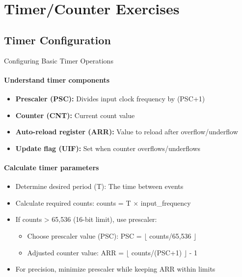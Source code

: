 \section{Timer/Counter Exercises}

\subsection{Timer Configuration}

\begin{KR}{Configuring Basic Timer Operations}\\
\paragraph{Understand timer components}
\begin{itemize}
    \item \textbf{Prescaler (PSC):} Divides input clock frequency by (PSC+1)
    \item \textbf{Counter (CNT):} Current count value
    \item \textbf{Auto-reload register (ARR):} Value to reload after overflow/underflow
    \item \textbf{Update flag (UIF):} Set when counter overflows/underflows
\end{itemize}

\paragraph{Calculate timer parameters}
\begin{itemize}
    \item Determine desired period (T): The time between events
    \item Calculate required counts: counts = T × input\_frequency
    \item If counts > 65,536 (16-bit limit), use prescaler:
    \begin{itemize}
        \item Choose prescaler value (PSC): PSC = $\lfloor$ counts/65,536 $\rfloor$
        \item Adjusted counter value: ARR = $\lfloor$ counts/(PSC+1) $\rfloor$ - 1
    \end{itemize}
    \item For precision, minimize prescaler while keeping ARR within limits
\end{itemize}


\end{KR}
